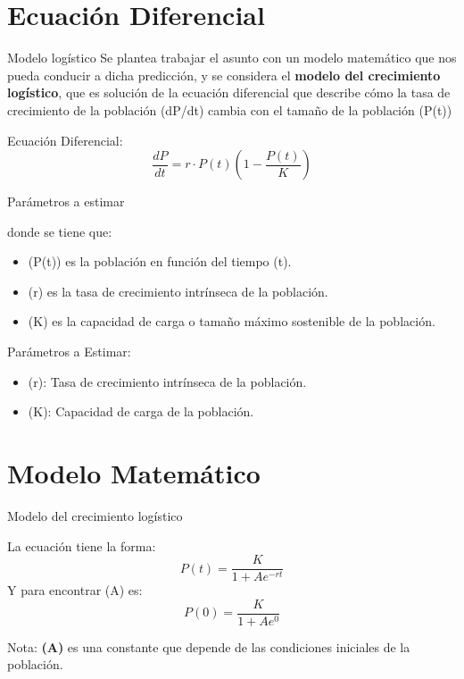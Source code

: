\documentclass{beamer}
\begin{document}
\section{Ecuación Diferencial}
\begin{frame}{Modelo logístico}
    Se plantea trabajar el asunto con un modelo matemático que nos pueda conducir a dicha predicción, y se considera 
    el \textbf{modelo del crecimiento logístico}, que es solución de la ecuación diferencial que describe cómo la tasa de crecimiento de la población (dP/dt) 
    cambia con el tamaño de la población (P(t)) 
    \begin{block}{Ecuación Diferencial:}
    $$\frac{dP}{dt} = r \cdot P(t)(1 - \frac{P(t)}{K}) $$
    \end{block}
\end{frame}
\begin{frame}{Parámetros a estimar}
\begin{block}{donde se tiene que:}
\begin{itemize}
    \item (P(t)) es la población en función del tiempo (t).
    \item (r) es la tasa de crecimiento intrínseca de la población.
    \item (K) es la capacidad de carga o tamaño máximo sostenible de la población.
\end{itemize}
\end{block}

\begin{block}{Parámetros a Estimar:}
\begin{itemize}
    \item (r): Tasa de crecimiento intrínseca de la población. 
    \item (K): Capacidad de carga de la población.
\end{itemize}
\end{block}
\end{frame}

\section{Modelo Matemático}
\begin{frame}{Modelo del crecimiento logístico}
    \begin{block}{La ecuación tiene la forma: }
    $$P(t) = \frac{K}{1 + Ae^{-rt}}$$
    Y para encontrar (A) es:
    $$P(0) = \frac{K}{1 + Ae^{0}}$$
    \end{block}
    Nota: \textbf{(A)} es una constante que depende de las condiciones iniciales de la población.
\end{frame}
\end{document}
